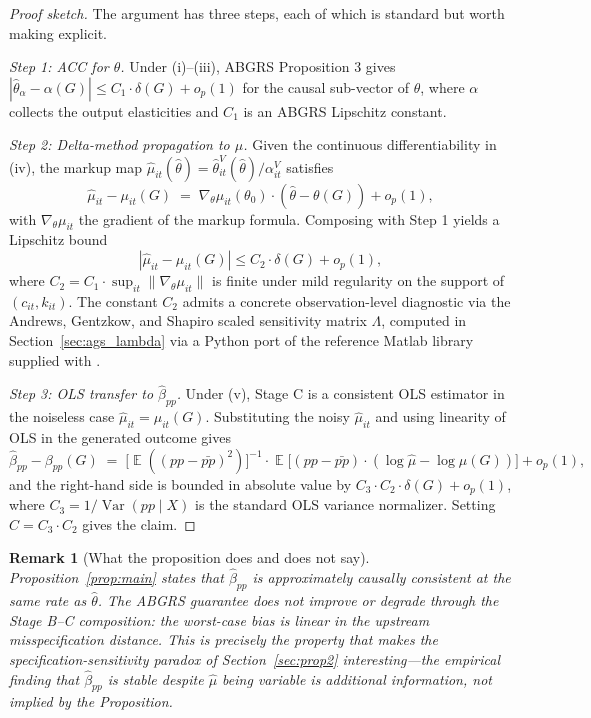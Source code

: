 \documentclass[11pt]{article}
\newtheorem{remark}{Remark}
\DeclareMathOperator{\E}{\mathbb{E}}
\DeclareMathOperator{\Var}{Var}
\begin{document}
\begin{proof}[Proof sketch]
The argument has three steps, each of which is standard but worth making explicit.

\emph{Step 1: ACC for $\hat\theta$.} Under (i)--(iii), ABGRS Proposition 3 \citep[p.~1831]{ABGRS2025} gives $|\hat\theta_\alpha - \alpha(G)| \leq C_1\cdot\delta(G) + o_p(1)$ for the causal sub-vector of $\theta$, where $\alpha$ collects the output elasticities and $C_1$ is an ABGRS Lipschitz constant.

\emph{Step 2: Delta-method propagation to $\hat\mu$.} Given the continuous differentiability in (iv), the markup map $\hat\mu_{it}(\hat\theta) = \hat\theta^V_{it}(\hat\theta)/\alpha^V_{it}$ satisfies
\[
\hat\mu_{it} - \mu_{it}(G) \;=\; \nabla_\theta \mu_{it}(\theta_0)\cdot(\hat\theta - \theta(G)) + o_p(1),
\]
with $\nabla_\theta \mu_{it}$ the gradient of the markup formula. Composing with Step 1 yields a Lipschitz bound
\[
|\hat\mu_{it} - \mu_{it}(G)| \leq C_2\cdot\delta(G) + o_p(1),
\]
where $C_2 = C_1\cdot\sup_{it}\|\nabla_\theta\mu_{it}\|$ is finite under mild regularity on the support of $(c_{it},k_{it})$. The constant $C_2$ admits a concrete observation-level diagnostic via the Andrews, Gentzkow, and Shapiro \cite{AGS2017} scaled sensitivity matrix $\Lambda$, computed in Section~\ref{sec:ags_lambda} via a Python port of the reference Matlab library supplied with \cite{AGS2017}.

\emph{Step 3: OLS transfer to $\hat\beta_{pp}$.} Under (v), Stage C is a consistent OLS estimator in the noiseless case $\hat\mu_{it} = \mu_{it}(G)$. Substituting the noisy $\hat\mu_{it}$ and using linearity of OLS in the generated outcome gives
\[
\hat\beta_{pp} - \beta_{pp}(G) \;=\; \bigl[\E((pp - \bar{pp})^2)\bigr]^{-1}\cdot\E\bigl[(pp-\bar{pp})\cdot(\log\hat\mu - \log\mu(G))\bigr] + o_p(1),
\]
and the right-hand side is bounded in absolute value by $C_3\cdot C_2\cdot\delta(G) + o_p(1)$, where $C_3 = 1/\Var(pp\mid X)$ is the standard OLS variance normalizer. Setting $C = C_3\cdot C_2$ gives the claim.
\end{proof}

\begin{remark}[What the proposition does and does not say]\label{rem:scope}
Proposition~\ref{prop:main} states that $\hat\beta_{pp}$ is approximately causally consistent \emph{at the same rate} as $\hat\theta$. The ABGRS guarantee does not improve or degrade through the Stage B--C composition: the worst-case bias is linear in the upstream misspecification distance. This is precisely the property that makes the specification-sensitivity paradox of Section~\ref{sec:prop2} interesting---the empirical finding that $\hat\beta_{pp}$ is stable despite $\hat\mu$ being variable is additional information, not implied by the Proposition.
\end{remark}
\end{document}
